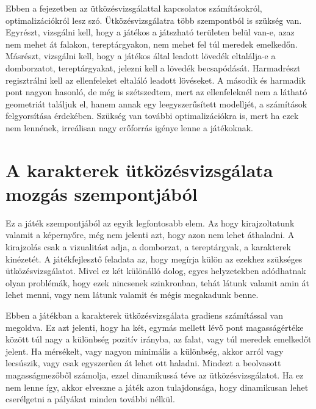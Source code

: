 \label{Chap:utkozesvizsgalat}





Ebben a fejezetben az ütközésvizsgálattal kapcsolatos számításokról, optimalizációkról lesz szó. Ütközésvizsgálatra több szempontból is szükség van. Egyrészt, vizsgálni kell, hogy a játékos a játszható területen belül van-e, azaz nem mehet át falakon, tereptárgyakon, nem mehet fel túl meredek emelkedőn. Másrészt, vizsgálni kell, hogy a játékos által leadott lövedék eltalálja-e a domborzatot, tereptárgyakat, jelezni kell a lövedék becsapódását. Harmadrészt regisztrálni kell az ellenfeleket eltaláló leadott lövéseket. A második és harmadik pont nagyon hasonló, de még is szétszedtem, mert az ellenfeleknél nem a látható geometriát találjuk el, hanem annak egy leegyszerűsített modelljét, a számítások felgyorsítása érdekében. Szükség van további optimalizációkra is, mert ha ezek nem lennének, irreálisan nagy erőforrás igénye lenne a játékoknak.

\section{A karakterek ütközésvizsgálata mozgás szempontjából}

Ez a játék szempontjából az egyik legfontosabb elem. Az hogy kirajzoltatunk valamit a képernyőre, még nem jelenti azt, hogy azon nem lehet áthaladni. A kirajzolás csak a vizualitást adja, a domborzat, a tereptárgyak, a karakterek kinézetét. A játékfejlesztő feladata az, hogy megírja külön az ezekhez szükséges ütközésvizsgálatot. Mivel ez két különálló dolog, egyes helyzetekben adódhatnak olyan problémák, hogy ezek nincsenek szinkronban, tehát látunk valamit amin át lehet menni, vagy nem látunk valamit és mégis megakadunk benne.

Ebben a játékban a karakterek ütközésvizsgálata gradiens számítással van megoldva. Ez azt jelenti, hogy ha két, egymás mellett lévő pont magasságértéke között túl nagy a különbség pozitív irányba, az falat, vagy túl meredek emelkedőt jelent. Ha mérsékelt, vagy nagyon minimális a különbség, akkor arról vagy lecsúszik, vagy csak egyszerűen át lehet ott haladni. Mindezt a beolvasott magasságmezőből számolja, ezzel dinamikussá téve az ütközésvizsgálatot. Ha ez nem lenne így, akkor elveszne a játék azon tulajdonsága, hogy dinamikusan lehet cserélgetni a pályákat minden további nélkül.

